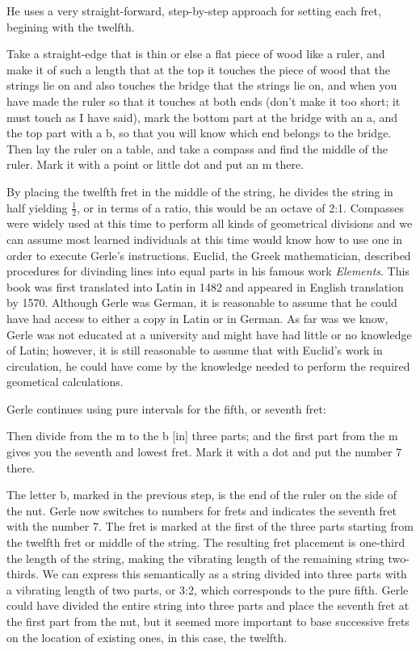 He uses a very straight-forward, step-by-step approach for setting each fret, begining with the
twelfth.
\begin{blocks}
Take a straight-edge that is thin or else a flat piece of wood like a
ruler, and make it of such a length that at the top it touches the piece of wood
that the strings lie on and also touches the bridge that the strings lie on, and
when you have made the ruler so that it touches at both ends (don't make it too
short; it must touch as I have said), mark the bottom part at the bridge with an
a, and the top part with a b, so that you will know which end belongs to the
bridge.  Then lay the ruler on a table, and take a compass and find the middle
of the ruler.  Mark it with a point or little dot and put an m there.
\end{blocks}
By placing the twelfth fret in the middle of the string, he divides the string in half yielding
$ \frac{1}{2} $, or in terms of a ratio, this would be an octave of 2:1.
Compasses were widely used at this time to perform all kinds of geometrical divisions
and we can assume most learned individuals at this time would know how to use one
in order to execute Gerle's instructions.  Euclid, the Greek mathematician, described
procedures for divinding lines into equal parts in his famous work \textit{Elements}.  This
book was first translated into Latin in 1482 and appeared in English translation by 1570.  Although
Gerle was German, it is reasonable to assume that he could have
had access to either a copy in Latin or in German.  As far was we know, Gerle was not educated
at a university and might have had little or no knowledge of Latin; however, it is still
reasonable to assume that with Euclid's work in circulation, he could have come by the knowledge
needed to perform the required geometical calculations.

Gerle continues using pure intervals for the fifth, or seventh fret:
\begin{blocks}
Then divide from the m to the b [in] three parts; and the first part from the m
gives you the seventh and lowest fret.  Mark it with a dot and put the number 7
there.
\end{blocks}
The letter b, marked in the previous step, is the end of the ruler on the side of the nut.
Gerle now switches to numbers for frets and indicates the seventh fret with the number
7.  The fret is marked at the first of the three parts
starting from the twelfth fret or middle of the string.  The resulting fret placement
is one-third the length
of the string, making the vibrating length of the remaining string two-thirds. We can express this
semantically as a string divided into three
parts with a vibrating length of two parts, or 3:2, which corresponds to the pure fifth.  Gerle could have
divided the
entire string into three parts and place the seventh fret at the first
part from the nut, but it seemed more important to base successive frets on the location of
existing ones, in this case, the twelfth.

